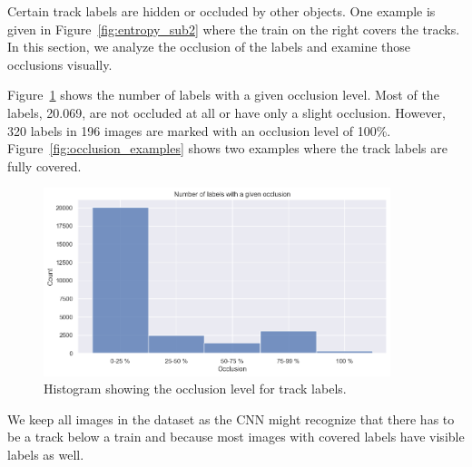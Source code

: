 \documentclass[Master,MDS,english]{BASE/twbook} %
\begin{document}
Certain track labels are hidden or occluded by other objects. One example is given in Figure~\ref{fig:entropy_sub2} where the train on the right covers the tracks.
In this section, we analyze the occlusion of the labels and examine those occlusions visually.

Figure~\ref{fig:occul_hist} shows the number of labels with a given occlusion level. Most of the labels, 20.069, are not occluded at all or have only a slight occlusion. However, 320 labels in 196 images are marked with an occlusion level of 100\%. Figure~\ref{fig:occlusion_examples} shows two examples where the track labels are fully covered.


\begin{figure}[h]
\centering
\includegraphics[width=0.9\textwidth]{images/datasets/db/occlusion_hist}
\caption{Histogram showing the occlusion level for track labels. }
\label{fig:occul_hist}
\end{figure}



We keep all images in the dataset as the CNN might recognize that there has to be a track below a train and because most images with covered labels have visible labels as well.
\end{document}
